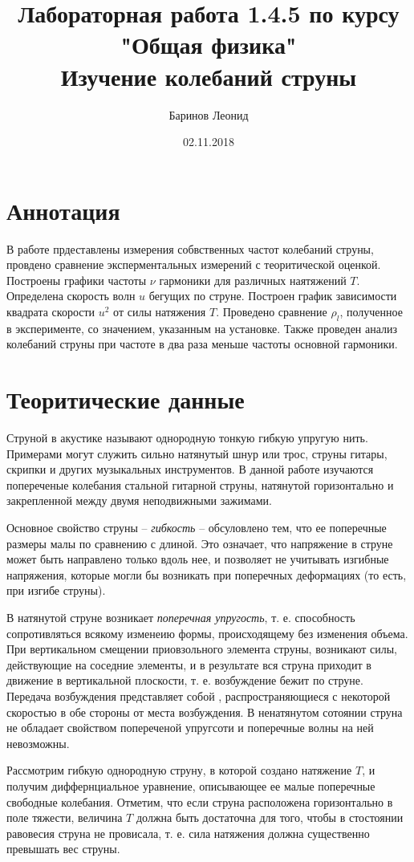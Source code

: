 \documentclass[a4paper,12pt]{article} %
\title{Лабораторная работа 1.4.5 по курсу \\ "Общая физика"  \\ 
\vspace{0.2cm}
\vspace{4.5cm}
 \LARGE{\textbf{Изучение колебаний струны}}\vspace{5.5cm}}
\date{02.11.2018}
\author{\vspace{0.2cm}Баринов Леонид}
\begin{document}
\maketitle
\newpage
\section{Аннотация} В работе прдеставлены измерения собвственных частот колебаний струны, провдено сравнение эксперментальных измерений с теоритической оценкой. Построены графики частоты $\nu$ гармоники для различных наятяжений $T$. Определена скорость волн $u$ бегущих по струне. Построен график зависимости квадрата скорости $u^2$ от силы натяжения $T$. Проведено сравнение $\rho_l$, полученное в эксперименте, со значением, указанным на установке. Также проведен анализ колебаний струны при частоте в два раза меньше частоты основной гармоники.

\section{Теоритические данные}
Струной в акустике называют однородную тонкую гибкую упругую нить. Примерами могут служить сильно натянутый шнур или трос, струны гитары, скрипки и других музыкальных инструментов. В данной работе изучаются попереченые колебания стальной гитарной струны, натянутой горизонтально и закрепленной между двумя неподвижными зажимами.

Основное свойство струны -- \textit{гибкость} -- обсуловлено тем, что ее поперечные размеры малы по сравнению с длиной. Это означает, что напряжение в струне может быть направлено только вдоль нее, и позволяет не учитывать изгибные напряжения, которые могли бы возникать при поперечных деформациях (то есть, при изгибе струны).

В натянутой струне возникает \textit{поперечная упругость}, т. е. способность сопротивляться всякому изменеию формы, происходящему без изменения объема. При вертикальном смещении приовзольного элемента струны, возникают силы, действующие на соседние элементы, и в результате вся струна приходит в движение в вертикальной плоскости, т. е. возбуждение бежит по струне. Передача возбуждения представляет собой , распространяющиеся с некоторой скоростью в обе стороны от места возбуждения. В ненатянутом сотоянии струна не обладает свойством попереченой упругсоти и поперечные волны на ней невозможны.

Рассмотрим гибкую однородную струну, в которой создано натяжение $T$, и получим диффернциальное уравнение, описывающее ее малые поперечные свободные колебания. Отметим, что если струна расположена горизонтально в поле тяжести, величина $T$ должна быть достаточна для того, чтобы в стостоянии равовесия струна не провисала, т. е. сила натяжения должна существенно превышать вес струны.
\end{document}
